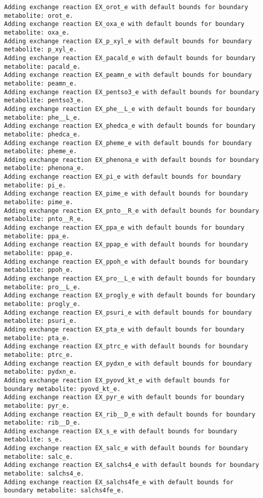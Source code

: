 \documentclass[
  letterpaper,
  DIV=11,
  numbers=noendperiod]{scrartcl}
\begin{document}
\begin{verbatim}
Adding exchange reaction EX_orot_e with default bounds for boundary metabolite: orot_e.
Adding exchange reaction EX_oxa_e with default bounds for boundary metabolite: oxa_e.
Adding exchange reaction EX_p_xyl_e with default bounds for boundary metabolite: p_xyl_e.
Adding exchange reaction EX_pacald_e with default bounds for boundary metabolite: pacald_e.
Adding exchange reaction EX_peamn_e with default bounds for boundary metabolite: peamn_e.
Adding exchange reaction EX_pentso3_e with default bounds for boundary metabolite: pentso3_e.
Adding exchange reaction EX_phe__L_e with default bounds for boundary metabolite: phe__L_e.
Adding exchange reaction EX_phedca_e with default bounds for boundary metabolite: phedca_e.
Adding exchange reaction EX_pheme_e with default bounds for boundary metabolite: pheme_e.
Adding exchange reaction EX_phenona_e with default bounds for boundary metabolite: phenona_e.
Adding exchange reaction EX_pi_e with default bounds for boundary metabolite: pi_e.
Adding exchange reaction EX_pime_e with default bounds for boundary metabolite: pime_e.
Adding exchange reaction EX_pnto__R_e with default bounds for boundary metabolite: pnto__R_e.
Adding exchange reaction EX_ppa_e with default bounds for boundary metabolite: ppa_e.
Adding exchange reaction EX_ppap_e with default bounds for boundary metabolite: ppap_e.
Adding exchange reaction EX_ppoh_e with default bounds for boundary metabolite: ppoh_e.
Adding exchange reaction EX_pro__L_e with default bounds for boundary metabolite: pro__L_e.
Adding exchange reaction EX_progly_e with default bounds for boundary metabolite: progly_e.
Adding exchange reaction EX_psuri_e with default bounds for boundary metabolite: psuri_e.
Adding exchange reaction EX_pta_e with default bounds for boundary metabolite: pta_e.
Adding exchange reaction EX_ptrc_e with default bounds for boundary metabolite: ptrc_e.
Adding exchange reaction EX_pydxn_e with default bounds for boundary metabolite: pydxn_e.
Adding exchange reaction EX_pyovd_kt_e with default bounds for boundary metabolite: pyovd_kt_e.
Adding exchange reaction EX_pyr_e with default bounds for boundary metabolite: pyr_e.
Adding exchange reaction EX_rib__D_e with default bounds for boundary metabolite: rib__D_e.
Adding exchange reaction EX_s_e with default bounds for boundary metabolite: s_e.
Adding exchange reaction EX_salc_e with default bounds for boundary metabolite: salc_e.
Adding exchange reaction EX_salchs4_e with default bounds for boundary metabolite: salchs4_e.
Adding exchange reaction EX_salchs4fe_e with default bounds for boundary metabolite: salchs4fe_e.

\end{verbatim}
\end{document}
